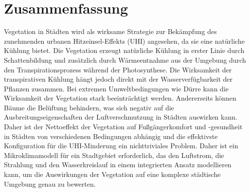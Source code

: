 \vskip 5cm

\vfill

\pagebreak


\chapter{Zusammenfassung}
Vegetation in St\"adten wird als wirksame Strategie zur Bek\"ampfung des zunehmenden urbanen Hitzeinsel-Effekts (UHI) angesehen, da sie eine nat\"urliche K\"uhlung bietet. Die Vegetation erzeugt natürliche Kühlung in erster Linie durch Schattenbildung und zusätzlich durch Wärmeentnahme aus der Umgebung durch den Transpirationsprozess während der Photosynthese. Die Wirksamkeit der transpirativen Kühlung hängt jedoch direkt mit der Wasserverfügbarkeit der Pflanzen zusammen. Bei extremen Umweltbedingungen wie Dürre kann die Wirksamkeit der Vegetation stark beeinträchtigt werden. Andererseits können Bäume die Belüftung behindern, was sich negativ auf die Ausbreitungseigenschaften der Luftverschmutzung in Städten auswirken kann. Daher ist der Nettoeffekt der Vegetation auf Fußgängerkomfort und -gesundheit in Städten von verschiedenen Bedingungen abhängig und die effektivste Konfiguration für die UHI-Minderung ein nichttriviales Problem. Daher ist ein Mikroklimamodell für ein Stadtgebiet erforderlich, das den Luftstrom, die Strahlung und den Wasserkreislauf in einem integrierten Ansatz modellieren kann, um die Auswirkungen der Vegetation auf eine komplexe städtische Umgebung genau zu bewerten.

